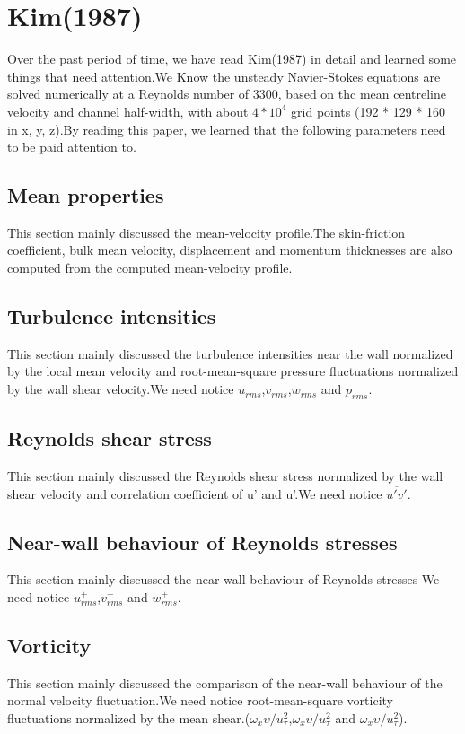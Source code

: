 \section{Kim(1987)}
Over the past period of time, we have read Kim(1987) in detail and learned some things that need attention.We Know the unsteady Navier-Stokes equations are solved numerically at a Reynolds number of 3300, based on thc mean centreline velocity and channel half-width, with about $4*10^4$ grid points (192 * 129 * 160 in x, y, z).By reading this paper, we learned that the following parameters need to be paid attention to.
\subsection{Mean properties}
This section mainly discussed the mean-velocity profile.The skin-friction coefficient, bulk  mean  velocity, displacement and momentum thicknesses are also computed from the computed mean-velocity profile. 
\subsection{Turbulence intensities}
This section mainly discussed the turbulence intensities near the wall normalized by the local mean velocity and root-mean-square pressure fluctuations normalized by the wall shear velocity.We need notice $u_{rms}$,$v_{rms}$,$w_{rms}$ and $p_{rms}$.
\subsection{Reynolds shear stress}
This section mainly discussed the Reynolds shear stress normalized by the wall shear velocity and correlation coefficient of u' and u'.We need notice $\overline{u'v'}$.
\subsection{Near-wall behaviour of Reynolds stresses}
This section mainly discussed the near-wall behaviour of Reynolds stresses We need notice $u_{rms}^+$,$v_{rms}^+$ and $w_{rms}^+$.
\subsection{Vorticity}
This section mainly discussed the comparison of the near-wall behaviour of the normal velocity fluctuation.We need notice root-mean-square vorticity fluctuations normalized by the mean shear.($\omega_x \upsilon/u_\tau^2$,$\omega_x \upsilon/u_\tau^2$ and $\omega_x \upsilon/u_\tau^2$).
